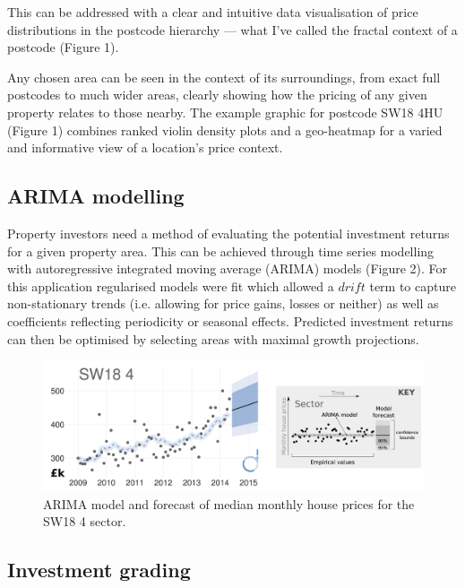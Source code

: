\documentclass[
10pt, %
a4paper, %
oneside, %
headinclude,footinclude, %
BCOR5mm, %
]{scrartcl}
\begin{document}

This can be addressed with a clear and intuitive data
visualisation of price distributions in the postcode hierarchy --- what
I've called the fractal context of a postcode (Figure 1).

Any chosen area can be seen in the context of its surroundings, from
exact full postcodes to much wider areas, clearly showing how the pricing of
any given property relates to those nearby.  The example graphic for
postcode SW18 4HU (Figure 1) combines ranked violin density plots and
a geo-heatmap for a varied and informative view of a location's price
context.

\vspace{-.5em}
\subsection*{ARIMA modelling}

Property investors need a method of evaluating the potential investment
returns for a given property area. This can be achieved through time
series modelling with autoregressive integrated moving average (ARIMA)
models (Figure 2). For this application regularised models were fit
which allowed a $drift$ term to capture non-stationary trends
(i.e. allowing for price gains, losses or neither) as well as coefficients
reflecting periodicity or seasonal effects. Predicted investment
returns can then be optimised by selecting areas with
maximal growth projections. 

\begin{figure}[h]
\centering
\vspace{.5em}
\includegraphics[width=.9\textwidth]{Figures/arima.png}
\vspace{-.5em}
\caption{ ARIMA model and forecast of median monthly house prices for the
  SW18 4 sector.}
\vspace{.75em}
\end{figure}

\vspace{-1.8em}
\subsection*{Investment grading}
\end{document}
